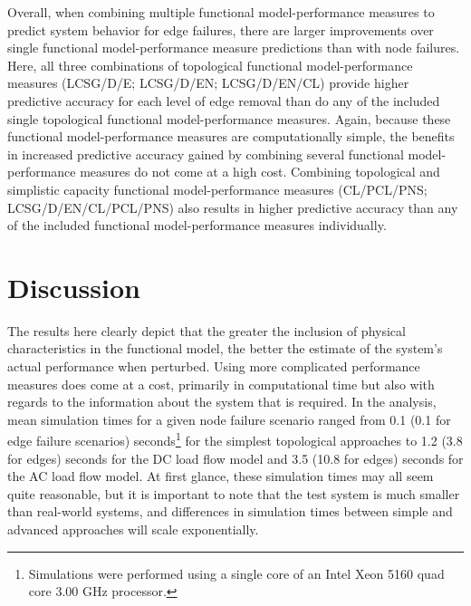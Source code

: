 Overall, when combining multiple functional model-performance measures to predict system behavior for edge failures, there are larger improvements over single functional model-performance measure predictions than with node failures.  Here, all three combinations of topological functional model-performance measures (LCSG/D/E; LCSG/D/EN; LCSG/D/EN/CL) provide higher predictive accuracy for each level of edge removal than do any of the included single topological functional model-performance measures.  Again, because these functional model-performance measures are computationally simple, the benefits in increased predictive accuracy gained by combining several functional model-performance measures do not come at a high cost. Combining topological and simplistic capacity functional model-performance measures (CL/PCL/PNS; LCSG/D/EN/CL/PCL/PNS) also results in higher predictive accuracy than any of the included functional model-performance measures individually.


\section{Discussion}
\label{sec:ch3:discussion}

The results here clearly depict that the greater the inclusion of physical characteristics in the functional model, the better the estimate of the system’s actual performance when perturbed. Using more complicated performance measures does come at a cost, primarily in computational time but also with regards to the information about the system that is required. In the analysis, mean simulation times for a given node failure scenario ranged from 0.1 (0.1 for edge failure scenarios) seconds\footnote[9]{Simulations were performed using a single core of an Intel Xeon 5160 quad core 3.00 GHz processor.} for the simplest topological approaches to 1.2 (3.8 for edges) seconds for the DC load flow model and 3.5 (10.8 for edges) seconds for the AC load flow model. At first glance, these simulation times may all seem quite reasonable, but it is important to note that the test system is much smaller than real-world systems, and differences in simulation times between simple and advanced approaches will scale exponentially.

